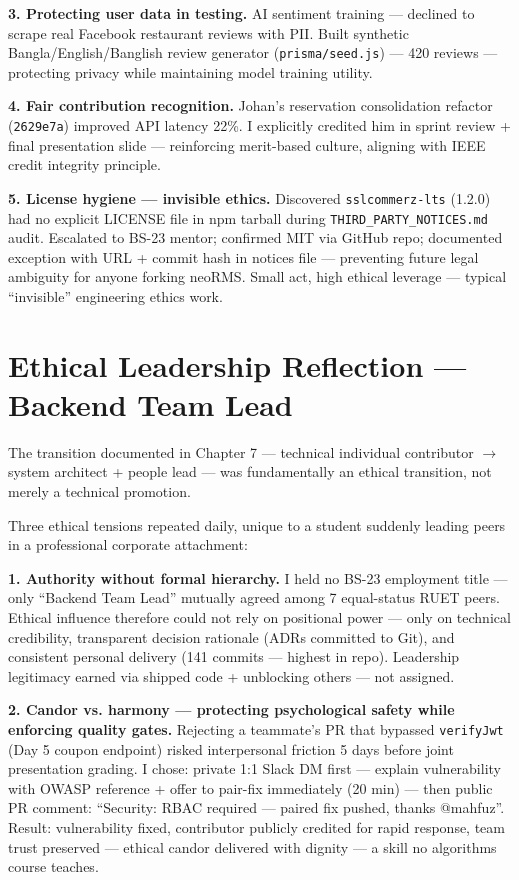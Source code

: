\textbf{3. Protecting user data in testing.} AI sentiment training --- declined to scrape real Facebook restaurant reviews with PII. Built synthetic Bangla/English/Banglish review generator (\texttt{prisma/seed.js}) --- 420 reviews --- protecting privacy while maintaining model training utility.

\textbf{4. Fair contribution recognition.} Johan's reservation consolidation refactor (\texttt{2629e7a}) improved API latency 22\%. I explicitly credited him in sprint review + final presentation slide --- reinforcing merit-based culture, aligning with IEEE credit integrity principle.

\textbf{5. License hygiene --- invisible ethics.} Discovered \texttt{sslcommerz-lts} (1.2.0) had no explicit LICENSE file in npm tarball during \texttt{THIRD\_PARTY\_NOTICES.md} audit. Escalated to BS-23 mentor; confirmed MIT via GitHub repo; documented exception with URL + commit hash in notices file --- preventing future legal ambiguity for anyone forking neoRMS. Small act, high ethical leverage --- typical ``invisible'' engineering ethics work.

\section{Ethical Leadership Reflection --- Backend Team Lead}
\label{sec:ethical_leadership}

The transition documented in Chapter 7 --- technical individual contributor $\rightarrow$ system architect + people lead --- was fundamentally an ethical transition, not merely a technical promotion.

Three ethical tensions repeated daily, unique to a student suddenly leading peers in a professional corporate attachment:

\textbf{1. Authority without formal hierarchy.} I held no BS-23 employment title --- only ``Backend Team Lead'' mutually agreed among 7 equal-status RUET peers. Ethical influence therefore could not rely on positional power --- only on technical credibility, transparent decision rationale (ADRs committed to Git), and consistent personal delivery (141 commits --- highest in repo). Leadership legitimacy earned via shipped code + unblocking others --- not assigned.

\textbf{2. Candor vs. harmony --- protecting psychological safety while enforcing quality gates.} Rejecting a teammate's PR that bypassed \texttt{verifyJwt} (Day 5 coupon endpoint) risked interpersonal friction 5 days before joint presentation grading. I chose: private 1:1 Slack DM first --- explain vulnerability with OWASP reference + offer to pair-fix immediately (20 min) --- then public PR comment: ``Security: RBAC required --- paired fix pushed, thanks @mahfuz''. Result: vulnerability fixed, contributor publicly credited for rapid response, team trust preserved --- ethical candor delivered with dignity --- a skill no algorithms course teaches.

